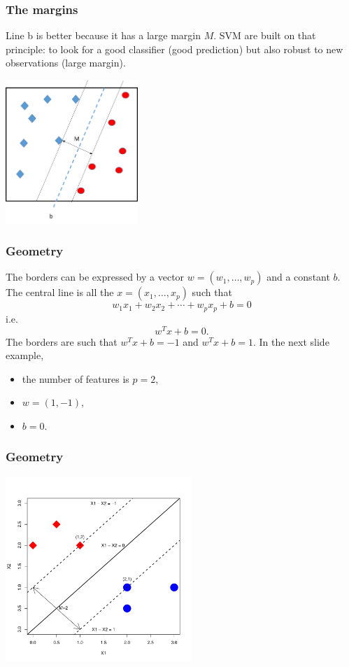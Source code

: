\begin{frame}
\frametitle{The margins}
Line b is better because it has a large margin $M$. SVM are built on that principle: to look for a good classifier (good prediction) but also robust to new observations (large margin).
\begin{center}
\includegraphics[width=5cm]{../../Graphs/SVM_Borders_3.png} 
\end{center}
\end{frame}
\begin{frame}
\frametitle{Geometry}
The borders can be expressed by a vector $w=(w_1,\ldots,w_p)$ and a constant $b$. The central line is all the $x=(x_1,\ldots,x_p)$ such that
$$
w_1x_1 + w_2x_2 + \cdots + w_p x_p + b = 0
$$
i.e.
$$
w^T x + b = 0.
$$
The borders are such that $w^T x + b = -1$ and $w^T x + b = 1$. In the next slide example,
\begin{itemize}
\item the number of features is $p=2$,
\item $w=(1,-1)$, 
\item $b=0$.
\end{itemize}
\end{frame}
\begin{frame}
\frametitle{Geometry}
\begin{center}
\includegraphics[width=7cm]{../../Graphs/SVM_Borders_4.png}
\end{center}
\end{frame}
